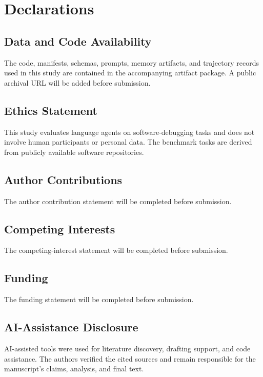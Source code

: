 \section*{Declarations}

\subsection*{Data and Code Availability}

The code, manifests, schemas, prompts, memory artifacts, and trajectory records
used in this study are contained in the accompanying artifact package. A public
archival URL will be added before submission.

\subsection*{Ethics Statement}

This study evaluates language agents on software-debugging tasks and does not
involve human participants or personal data. The benchmark tasks are derived
from publicly available software repositories.

\subsection*{Author Contributions}

The author contribution statement will be completed before submission.

\subsection*{Competing Interests}

The competing-interest statement will be completed before submission.

\subsection*{Funding}

The funding statement will be completed before submission.

\subsection*{AI-Assistance Disclosure}

AI-assisted tools were used for literature discovery, drafting support, and
code assistance. The authors verified the cited sources and remain responsible
for the manuscript's claims, analysis, and final text.
